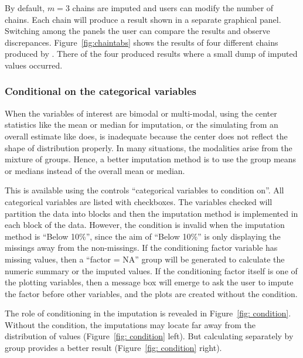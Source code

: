 \documentclass[article]{jss}
\begin{document}
By default, $m=3$ chains are imputed and users can modify the number of chains. Each chain will produce a result shown in a separate graphical panel. Switching among the panels the user can compare the results and observe discrepances. Figure~\ref{fig:chaintabs} shows the results of four different chains produced by . There of the four produced results where a small dump of imputed values occurred.


\subsubsection{Conditional on the categorical variables}

When the variables of interest are bimodal or multi-modal, using the center statistics like the mean or median for imputation, or the simulating from an overall estimate like  does, is inadequate because the center does not reflect the shape of distribution properly. In many situations, the modalities arise from the mixture of groups. Hence, a better imputation method is to use the group means or medians instead of the overall mean or median.

This is available using the controls ``categorical variables to condition on''. All categorical variables are listed with checkboxes. The variables checked will partition the data into blocks and then the imputation method is implemented in each block of the data. However, the condition is invalid when the imputation method is ``Below 10\%'', since the aim of ``Below 10\%'' is only displaying the missings away from the non-missings. If the conditioning factor variable has missing values, then a ``factor = NA'' group will be generated to calculate the numeric summary or the imputed values. If the conditioning factor itself is one of the plotting variables, then a message box will emerge to ask the user to impute the factor before other variables, and the plots are created without the condition.

The role of conditioning in the imputation is revealed in Figure~\ref{fig: condition}. Without the condition, the imputations may locate far away from the distribution of values (Figure~\ref{fig: condition} left). But calculating separately by group provides a better result (Figure~\ref{fig: condition} right).
\end{document}
